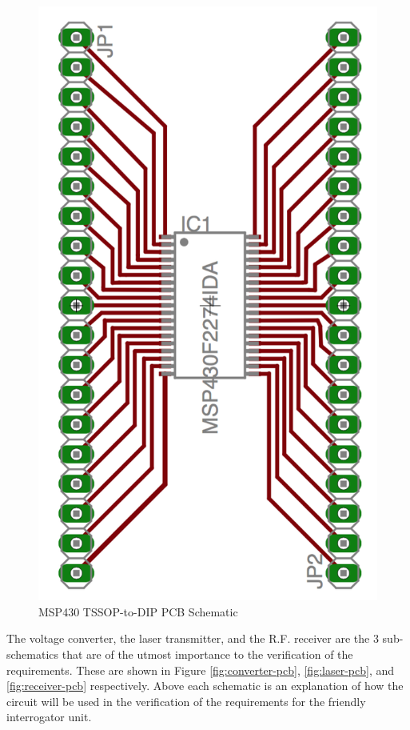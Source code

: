 \documentclass[letterpaper,10pt]{article}
\begin{document}
\begin{spacing}{1.15}
\begin{figure} [H]
	\centering
	\includegraphics[scale=0.3, angle = 270]{msp-breakout.png}
	\caption{MSP430 TSSOP-to-DIP PCB Schematic\label{fig:msp-breakout}}
\end{figure}


 The voltage converter, the laser transmitter, and the R.F. receiver are the 3 sub-schematics that are of the utmost importance to the verification of the requirements. These are shown in Figure \ref{fig:converter-pcb}, \ref{fig:laser-pcb}, and \ref{fig:receiver-pcb} respectively. Above each schematic is an explanation of how the circuit will be used in the verification of the requirements for the friendly interrogator unit. 


\end{spacing}
\end{document}
